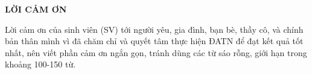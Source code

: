 \documentclass[../DoAn.tex]{subfiles}
\begin{document}
\begin{center}
    \Large{\textbf{LỜI CẢM ƠN}}\\
\end{center}
\vspace{1cm}
Lời cảm ơn của sinh viên (SV) tới người yêu, gia đình, bạn bè, thầy cô, và chính bản thân mình vì đã chăm chỉ và quyết tâm thực hiện ĐATN để đạt kết quả tốt nhất, nên viết phần cảm ơn ngắn gọn, tránh dùng các từ sáo rỗng, giới hạn trong khoảng 100-150 từ. 
\end{document}
